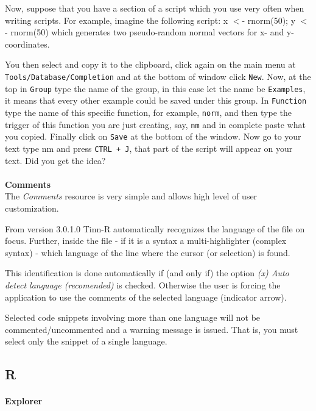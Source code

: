 Now, suppose that you have a section of a script which you use very often when writing scripts.
For example, imagine the following script: x $<$- rnorm(50); y $<$- rnorm(50) which generates
two pseudo-random normal vectors for x- and y-coordinates.

You then select and copy it to the clipboard, click again on the main menu at
\texttt{Tools/Database/Completion} and at the bottom of window click \texttt{New}.
Now, at the top in \texttt{Group} type the name of the group, in this case let the name be \texttt{Examples},
it means that every other example could be saved under this group. In \texttt{Function} type the name of this
specific function, for example, \texttt{norm}, and then type the trigger of this function you are just creating,
say, \texttt{nm} and in complete paste what you copied. Finally click on \texttt{Save} at the bottom of the window.
Now go to your text type nm and press \texttt{CTRL + J},
that part of the script will appear on your text. Did you get the idea?

\paragraph{}\textbf{Comments}\\
The \textit{Comments} resource is very simple and allows high level
of user customization.

From version 3.0.1.0 Tinn-R automatically recognizes the
language of the file on focus. Further, inside the file
- if it is a syntax a multi-highlighter (complex syntax) - which language of
the line where the cursor (or selection) is found.

This identification is done automatically if (and only if) the option
\textit{(x) Auto detect language (recomended)} is checked. Otherwise
the user is forcing the application to use the comments of the selected language
(indicator arrow).

Selected code snippets involving more than one language will not be commented/uncommented
and a warning message is issued. That is, you must select only the snippet of a single language.

\newpage
\subsection{R}

\paragraph{}\textbf{Explorer}\\

